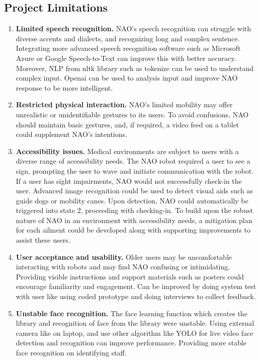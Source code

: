 \documentclass[conference]{IEEEtran}
\begin{document}
\subsection{Project Limitations}

\begin{enumerate} 
        \item \textbf{Limited speech recognition.} NAO’s speech recognition can struggle with diverse accents and dialects, and recognizing long and complex sentence. Integrating more advanced speech recognition software such as Microsoft Azure or Google Speech-to-Text can improve this with better accuracy. Moreover, NLP from nltk library such as tokenize can be used to understand complex input. Openai can be used to analysis input and improve NAO response to be more intelligent.
        \item \textbf{Restricted physical interaction.} NAO’s limited mobility may offer unrealistic or unidentifiable gestures to its users. To avoid confusions, NAO should maintain basic gestures, and, if required, a video feed on a tablet could supplement NAO’s intentions.
        \item \textbf{Accessibility issues.} Medical environments are subject to users with a diverse range of accessibility needs. The NAO robot required a user to see a sign, prompting the user to wave and initiate communication with the robot. If a user has sight impairments, NAO would not successfully check-in the user.  Advanced image recognition could be used to detect visual aids such as guide dogs or mobility canes. Upon detection, NAO could automatically be triggered into state 2, proceeding with checking-in. To build upon the robust nature of NAO in an environment with accessibility needs, a mitigation plan for each ailment could be developed along with supporting improvements to assist these users.
        \item \textbf{User acceptance and usability.} Older users may be uncomfortable interacting with robots and may find NAO confusing or intimidating. Providing visible instructions and support materials such as posters could encourage familiarity and engagement. Can be improved by doing system test with user like using coded prototype and doing interviews to collect feedback.
        \item \textbf{Unstable face recognition.} The face learning function which creates the library and recognition of face from the library were unstable. Using external camera like on laptop, and use other algorithm like YOLO for live video face detection and recognition can improve performance. Providing more stable face recognition on identifying staff. 
\end{enumerate}
\end{document}
